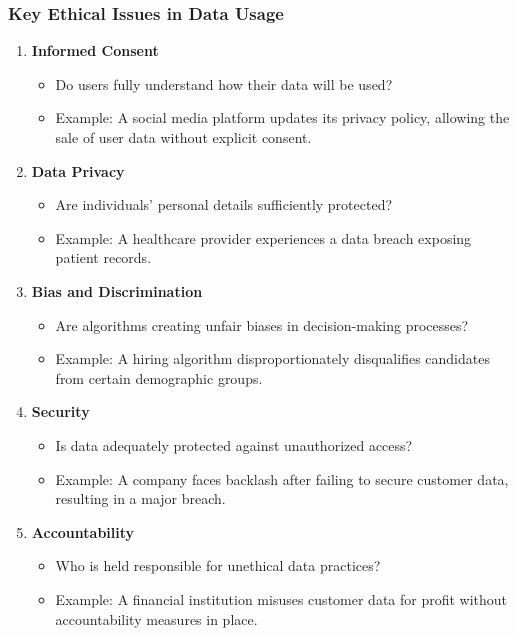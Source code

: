 \documentclass[aspectratio=169]{beamer}
\begin{document}
\begin{frame}[fragile]
    \frametitle{Key Ethical Issues in Data Usage}
    \begin{enumerate}
        \item \textbf{Informed Consent}
            \begin{itemize}
                \item Do users fully understand how their data will be used?
                \item Example: A social media platform updates its privacy policy, allowing the sale of user data without explicit consent.
            \end{itemize}
        \item \textbf{Data Privacy}
            \begin{itemize}
                \item Are individuals’ personal details sufficiently protected?
                \item Example: A healthcare provider experiences a data breach exposing patient records.
            \end{itemize}
        \item \textbf{Bias and Discrimination}
            \begin{itemize}
                \item Are algorithms creating unfair biases in decision-making processes?
                \item Example: A hiring algorithm disproportionately disqualifies candidates from certain demographic groups.
            \end{itemize}
        \item \textbf{Security}
            \begin{itemize}
                \item Is data adequately protected against unauthorized access?
                \item Example: A company faces backlash after failing to secure customer data, resulting in a major breach.
            \end{itemize}
        \item \textbf{Accountability}
            \begin{itemize}
                \item Who is held responsible for unethical data practices?
                \item Example: A financial institution misuses customer data for profit without accountability measures in place.
            \end{itemize}
    \end{enumerate}
\end{frame}
\end{document}
